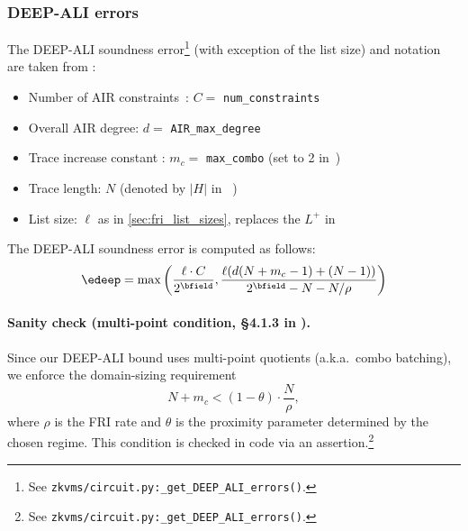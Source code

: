 \subsubsection{DEEP-ALI errors}\label{sec:fri-deep-ali}

The DEEP-ALI soundness error\footnote{See \texttt{zkvms/circuit.py:\_get\_DEEP\_ALI\_errors()}.} (with exception of the list size) and notation are taken from \cite[Section 5.2]{habock2022summary}:
\begin{itemize}
    \item Number of AIR constraints~\cite[p.15]{habock2022summary}: $C=$ \texttt{num\_constraints}
    \item Overall AIR degree: $d =$ \texttt{AIR\_max\_degree}
    \item Trace increase constant \cite[Remark 7]{habock2022summary}: $m_c=$ \texttt{max\_combo} (set to 2 in~\cite{habock2022summary})
    \item Trace length: $N$ (denoted by $|H|$ in ~\cite{habock2022summary})
    \item List size: $\ell$ as in \cref{sec:fri_list_sizes}, replaces the $L^{+}$ in ~\cite{habock2022summary}
\end{itemize}

The DEEP-ALI soundness error is computed as follows:
\begin{equation}
    \edeep = \max\left(\frac{\ell\cdot C}{2^{\bfield}}, \frac{\ell(d(N+m_c-1)+(N-1))}{2^{\bfield}-N-N/\rho}\right)
\end{equation}

\paragraph{Sanity check (multi-point condition, \S4.1.3 in \cite{habock2022summary}).}
Since our DEEP-ALI bound uses multi-point quotients (a.k.a.\ combo batching), we enforce the domain-sizing requirement
\begin{equation}\label{eq:multipoint_condition}
    N + m_c < (1-\theta)\cdot \frac{N}{\rho},
\end{equation}
where $\rho$ is the FRI rate and $\theta$ is the proximity parameter determined by the chosen regime.
This condition is checked in code via an assertion.\footnote{See \texttt{zkvms/circuit.py:\_get\_DEEP\_ALI\_errors()}.}

